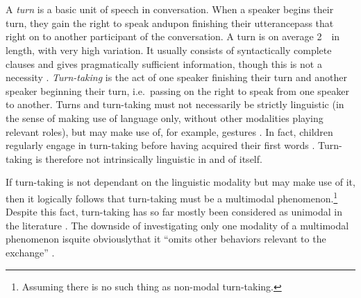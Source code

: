
\chapter{\introduction}
\label{ch:introduction}
A \emph{turn} is a basic unit of speech in conversation.
When a speaker begins their turn, they gain the right to speak and\dash upon finishing their utterance\dash pass that right on to another participant of the conversation.
A turn is on average 2~\s\ in length, with very high variation.
It usually consists of syntactically complete clauses and gives pragmatically sufficient information, though this is not a necessity \citep[]{levinson_turn-taking_2016}.
\emph{Turn-taking} is the act of one speaker finishing their turn and another speaker beginning their turn, i.e.\ passing on the right to speak from one speaker to another. %
Turns and turn-taking must not necessarily be strictly linguistic (in the sense of making use of language only, without other modalities playing relevant roles), but may make use of, for example, gestures \citep[]{schmitt_zur_2005}.
In fact, children regularly engage in turn-taking before having acquired their first words \citep[]{casillas_turn-taking_2016}.
Turn-taking is therefore not intrinsically linguistic in and of itself.

If turn-taking is not dependant on the linguistic modality but may make use of it, then it logically follows that turn-taking must be a multimodal phenomenon.\footnote{%
Assuming there is no such thing as non-modal turn-taking.}
Despite this fact, turn-taking has so far mostly been considered as unimodal in the literature \citep[]{rohlfing_multimodal_underreview}.
The downside of investigating only one modality of a multimodal phenomenon is\dash quite obviously\dash that it ``omits other behaviors relevant to the exchange'' \citep[]{rohlfing_multimodal_underreview}.

